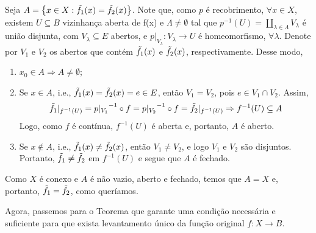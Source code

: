 \begin{dem}
    Seja $A = \left\{x \in X : \Tilde{f_1}(x) = \Tilde{f_2}(x) \right\}$. Note que, como $p$ é recobrimento, $\forall x \in X$, existem $U \subseteq B$ vizinhança aberta de f(x) e $\Lambda \neq \emptyset$ tal que $p^{-1}(U) = \coprod_{\lambda \in \Lambda}{} V_{\lambda}$ é união disjunta, com $V_\lambda \subseteq E$ abertos, e $p|_{V_\lambda} : V_\lambda \rightarrow U$ é homeomorfismo, $\forall \lambda$. Denote por $V_1$ e $V_2$ os abertos que contém $\Tilde{f_1}(x)$ e $\Tilde{f_2}(x)$, respectivamente. Desse modo,
    \begin{enumerate}
        \item $x_0 \in A \Rightarrow A \neq \emptyset$;
        \item Se $x \in A$, i.e., $\Tilde{f_1}(x) = \Tilde{f_2}(x) = e \in E$, então $V_1 = V_2$, pois $e \in V_1 \cap V_2$. Assim,
            \begin{equation}
            \Tilde{f_1}|_{f^{-1}(U)} = {p|_{V_1}}^{-1} \circ f = {p|_{V_2}}^{-1} \circ f = \Tilde{f_2}|_{f^{-1}(U)} \Rightarrow f^{-1}(U) \subseteq A
            \end{equation}
        Logo, como $f$ é contínua, $f^{-1}(U)$ é aberta e, portanto, $A$ é aberto.
        \item Se $x \notin A$, i.e., $\Tilde{f_1}(x) \neq \Tilde{f_2}(x)$, então $V_1 \neq V_2$, e logo $V_1$ e $V_2$ são disjuntos. Portanto, $\Tilde{f_1} \neq \Tilde{f_2}$ em $f^{-1}(U)$ e segue que $A$ é fechado.
    \end{enumerate}
    Como $X$ é conexo e $A$ é não vazio, aberto e fechado, temos que $A = X$ e, portanto, $\Tilde{f_1} = \Tilde{f_2}$, como queríamos.
\end{dem}

Agora, passemos para o Teorema que garante uma condição necessária e suficiente para que exista levantamento único da função original $f : X \rightarrow B$.

